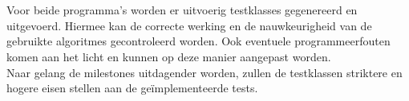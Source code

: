 
\\
\\
Voor beide programma's worden er uitvoerig testklasses gegenereerd en uitgevoerd. Hiermee kan de correcte werking en de nauwkeurigheid van de gebruikte algoritmes gecontroleerd worden. Ook eventuele programmeerfouten komen aan het licht en kunnen op deze manier aangepast worden. 
\\
Naar gelang de milestones uitdagender worden, zullen de testklassen striktere en hogere eisen stellen aan de ge\"implementeerde tests.
